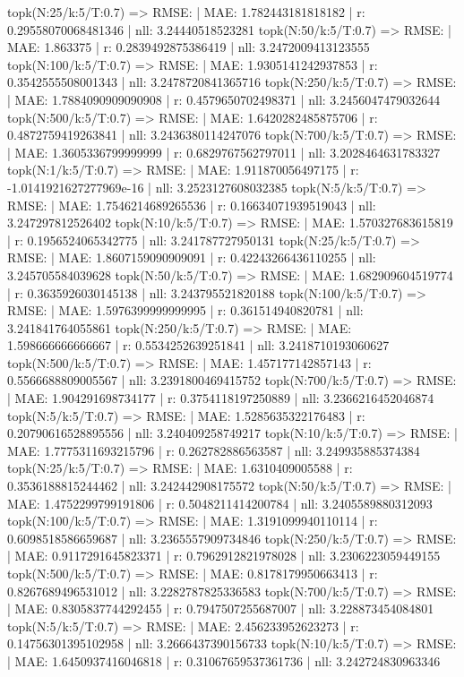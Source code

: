 topk(N:25/k:5/T:0.7) => RMSE: | MAE: 1.782443181818182 | r: 0.29558070068481346 | nll: 3.24440518523281
topk(N:50/k:5/T:0.7) => RMSE: | MAE: 1.863375 | r: 0.2839492875386419 | nll: 3.2472009413123555
topk(N:100/k:5/T:0.7) => RMSE: | MAE: 1.9305141242937853 | r: 0.3542555508001343 | nll: 3.2478720841365716
topk(N:250/k:5/T:0.7) => RMSE: | MAE: 1.7884090909090908 | r: 0.4579650702498371 | nll: 3.2456047479032644
topk(N:500/k:5/T:0.7) => RMSE: | MAE: 1.6420282485875706 | r: 0.4872759419263841 | nll: 3.2436380114247076
topk(N:700/k:5/T:0.7) => RMSE: | MAE: 1.3605336799999999 | r: 0.6829767562797011 | nll: 3.2028464631783327
topk(N:1/k:5/T:0.7) => RMSE: | MAE: 1.911870056497175 | r: -1.0141921627277969e-16 | nll: 3.2523127608032385
topk(N:5/k:5/T:0.7) => RMSE: | MAE: 1.7546214689265536 | r: 0.16634071939519043 | nll: 3.247297812526402
topk(N:10/k:5/T:0.7) => RMSE: | MAE: 1.570327683615819 | r: 0.1956524065342775 | nll: 3.241787727950131
topk(N:25/k:5/T:0.7) => RMSE: | MAE: 1.8607159090909091 | r: 0.42243266436110255 | nll: 3.245705584039628
topk(N:50/k:5/T:0.7) => RMSE: | MAE: 1.682909604519774 | r: 0.3635926030145138 | nll: 3.243795521820188
topk(N:100/k:5/T:0.7) => RMSE: | MAE: 1.5976399999999995 | r: 0.361514940820781 | nll: 3.241841764055861
topk(N:250/k:5/T:0.7) => RMSE: | MAE: 1.598666666666667 | r: 0.5534252639251841 | nll: 3.2418710193060627
topk(N:500/k:5/T:0.7) => RMSE: | MAE: 1.457177142857143 | r: 0.5566688809005567 | nll: 3.2391800469415752
topk(N:700/k:5/T:0.7) => RMSE: | MAE: 1.904291698734177 | r: 0.3754118197250889 | nll: 3.2366216452046874
topk(N:5/k:5/T:0.7) => RMSE: | MAE: 1.5285635322176483 | r: 0.20790616528895556 | nll: 3.240409258749217
topk(N:10/k:5/T:0.7) => RMSE: | MAE: 1.7775311693215796 | r: 0.262782886563587 | nll: 3.249935885374384
topk(N:25/k:5/T:0.7) => RMSE: | MAE: 1.6310409005588 | r: 0.3536188815244462 | nll: 3.242442908175572
topk(N:50/k:5/T:0.7) => RMSE: | MAE: 1.4752299799191806 | r: 0.5048211414200784 | nll: 3.2405589880312093
topk(N:100/k:5/T:0.7) => RMSE: | MAE: 1.3191099940110114 | r: 0.6098518586659687 | nll: 3.2365557909734846
topk(N:250/k:5/T:0.7) => RMSE: | MAE: 0.9117291645823371 | r: 0.7962912821978028 | nll: 3.2306223059449155
topk(N:500/k:5/T:0.7) => RMSE: | MAE: 0.8178179950663413 | r: 0.8267689496531012 | nll: 3.2282787825336583
topk(N:700/k:5/T:0.7) => RMSE: | MAE: 0.8305837744292455 | r: 0.7947507255687007 | nll: 3.228873454084801
topk(N:5/k:5/T:0.7) => RMSE: | MAE: 2.456233952623273 | r: 0.14756301395102958 | nll: 3.2666437390156733
topk(N:10/k:5/T:0.7) => RMSE: | MAE: 1.6450937416046818 | r: 0.31067659537361736 | nll: 3.242724830963346
